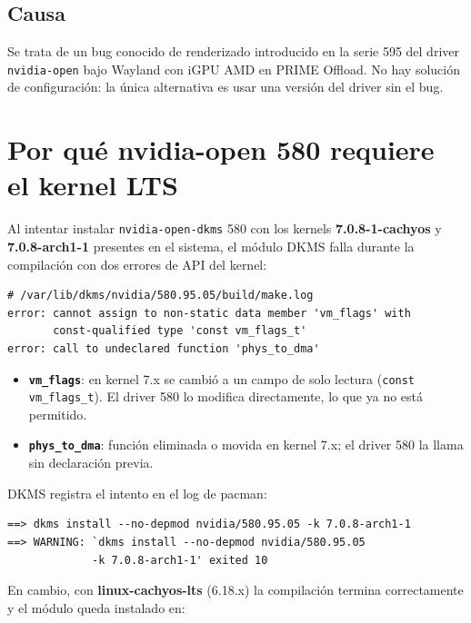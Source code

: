 \documentclass[12pt,a4paper]{article}
\begin{document}
\subsection{Causa}

Se trata de un bug conocido de renderizado introducido en la serie 595 del
driver \texttt{nvidia-open} bajo Wayland con iGPU AMD en PRIME Offload. No
hay solución de configuración: la única alternativa es usar una versión del
driver sin el bug.

\section{Por qué nvidia-open 580 requiere el kernel LTS}

Al intentar instalar \texttt{nvidia-open-dkms} 580 con los kernels
\textbf{7.0.8-1-cachyos} y \textbf{7.0.8-arch1-1} presentes en el sistema,
el módulo DKMS falla durante la compilación con dos errores de API del
kernel:

\begin{lstlisting}[style=bash]
# /var/lib/dkms/nvidia/580.95.05/build/make.log
error: cannot assign to non-static data member 'vm_flags' with
       const-qualified type 'const vm_flags_t'
error: call to undeclared function 'phys_to_dma'
\end{lstlisting}

\begin{itemize}
  \item \textbf{\texttt{vm\_flags}}: en kernel 7.x se cambió a un campo de
        solo lectura (\texttt{const vm\_flags\_t}). El driver 580 lo
        modifica directamente, lo que ya no está permitido.
  \item \textbf{\texttt{phys\_to\_dma}}: función eliminada o movida en
        kernel 7.x; el driver 580 la llama sin declaración previa.
\end{itemize}

DKMS registra el intento en el log de pacman:

\begin{lstlisting}[style=bash]
==> dkms install --no-depmod nvidia/580.95.05 -k 7.0.8-arch1-1
==> WARNING: `dkms install --no-depmod nvidia/580.95.05
             -k 7.0.8-arch1-1' exited 10
\end{lstlisting}

En cambio, con \textbf{linux-cachyos-lts} (6.18.x) la compilación termina
correctamente y el módulo queda instalado en:
\end{document}

